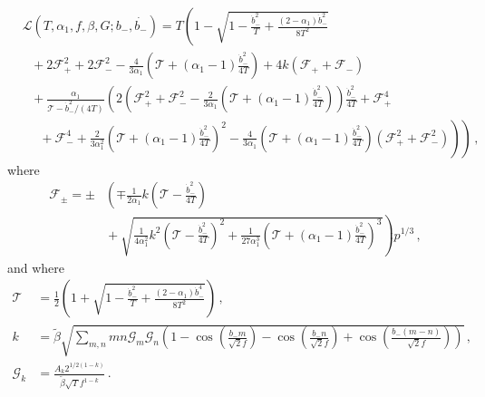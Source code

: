 \documentclass[12pt]{article}
\begin{document}
\begin{equation} \label{eq:dbi:lagrangian}
  \begin{aligned}
    &\mathcal{L}\left(T, \alpha_1, f, \beta, G; b_-, \dot{b_-}\right) = T \left(
        1
      - \sqrt{
          1
        - \frac{{\dot b}_-^2}{T}
        + \frac{\left(2 - \alpha_1\right) {\dot b}_-^2}{8 T^2}
      }\right.\\
      &~~~ \left.{}
      + 2 \mathcal{F}_+^2
      + 2 \mathcal{F}_-^2
      - \frac{4}{3 \alpha_1} \left(
        \mathcal{T} + \left(\alpha_1 - 1\right) \frac{{\dot b}_-^2}{4 T}
      \right)
      + 4 k \left(\mathcal{F}_+ + \mathcal{F}_-\right)\right.\\
      &~~~ \left.{}
      + \frac{\alpha_1}{\mathcal{T} - {\dot b}_-^2 / \left(4 T\right)}\left(
          2 \left(
              \mathcal{F}_+^2
            + \mathcal{F}_-^2
            - \frac{2}{3 \alpha_1}
              \left(\mathcal{T} + \left(\alpha_1 - 1\right) \frac{{\dot b}_-^2}{4 T}\right)
          \right) \frac{{\dot b}_-^2}{4 T}
        + \mathcal{F}_+^4\right.\right.\\
        &~~~~~~ \left.\left.{}
        + \mathcal{F}_-^4
        + \frac{2}{3 \alpha_1^2}
          \left(\mathcal{T} + \left(\alpha_1 - 1\right) \frac{{\dot b}_-^2}{4 T}\right)^2
        - \frac{4}{3 \alpha_1}
          \left(\mathcal{T} + \left(\alpha_1 - 1\right) \frac{{\dot b}_-^2}{4 T}\right)
          \left(\mathcal{F}_+^2 + \mathcal{F}_-^2\right)
      \right)
    \right)\,,
  \end{aligned}
\end{equation}
where
\begin{equation}
  \begin{aligned}
    \mathcal{F}_\pm = \pm &\left(
      \mp\frac{1}{2 \alpha_1} k \left(\mathcal{T} - \frac{{\dot b}_-^2}{4 T}\right)\right.\\
      &\left.{} + \sqrt{
          \frac{1}{4 \alpha_1^2} k^2 \left(\mathcal{T} - \frac{{\dot b}_-^2}{4 T}\right)^2
        + \frac{1}{27 \alpha_1^3} \left(
            \mathcal{T}
          + \left(\alpha_1 - 1\right) \frac{{\dot b}_-^2}{4 T}
        \right)^3
      }
    \right) \mathit{p}^{1 / 3}\,,
  \end{aligned}
\end{equation}
and where
\begin{align} %
  \mathcal{T} &= \frac{1}{2} \left(
      1
    + \sqrt{1 - \frac{{\dot b}_-^2}{T} + \frac{\left(2 - \alpha_1\right){\dot b}_-^4}{8 T^2}}
  \right)\,,\\
  k &= \tilde\beta \sqrt{\sum_{m, n} m n \mathcal{G}_m \mathcal{G}_n \left(
      1
    - \cos\left(\frac{b_- m}{\sqrt{2} f}\right)
    - \cos\left(\frac{b_- n}{\sqrt{2} f}\right)
    + \cos\left(\frac{b_- \left(m - n\right)}{\sqrt{2} f}\right)
  \right)}\,,\\
  \mathcal{G}_k &= \frac{A_k 2^{1 / 2 \left(1 - k\right)}}{\tilde\beta \sqrt{T} f^{1 - k}}\,.
\end{align}
\end{document}

